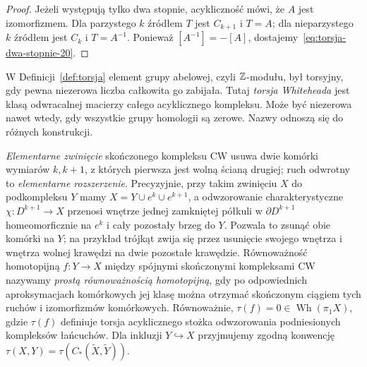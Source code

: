 \begin{proof}
Jeżeli występują tylko dwa stopnie, acykliczność
mówi, że $A$ jest izomorfizmem. Dla parzystego $k$
źródłem $T$ jest $C_{k+1}$ i $T=A$; dla nieparzystego
$k$ źródłem jest $C_k$ i $T=A^{-1}$.
Ponieważ $[A^{-1}]=-[A]$, dostajemy~\eqref{eq:torsja-dwa-stopnie-20}.
\end{proof}

\begin{uwaga}
W Definicji~\ref{def:torsja} element grupy abelowej,
czyli $\mathbb{Z}$-modułu, był torsyjny, gdy pewna niezerowa liczba
całkowita go zabijała. Tutaj \emph{torsja Whiteheada} jest klasą
odwracalnej macierzy całego acyklicznego kompleksu.
Może być niezerowa nawet wtedy, gdy wszystkie grupy
homologii są zerowe. Nazwy odnoszą się do różnych
konstrukcji.
\end{uwaga}

\begin{definicja}
\label{def:prosta-homotopia-20}
\emph{Elementarne zwinięcie} skończonego kompleksu CW
usuwa dwie komórki wymiarów $k,k+1$, z których
pierwsza jest wolną ścianą drugiej; ruch odwrotny
to \emph{elementarne rozszerzenie}.
Precyzyjnie, przy takim zwinięciu $X$ do podkompleksu $Y$ mamy
$X=Y\cup e^k\cup e^{k+1}$, a odwzorowanie charakterystyczne
$\chi:D^{k+1}\to X$ przenosi wnętrze jednej zamkniętej
półkuli w $\partial D^{k+1}$ homeomorficznie na $e^k$
i cały pozostały brzeg do $Y$. Pozwala to zsunąć obie komórki
na $Y$; na przykład trójkąt zwija się przez usunięcie swojego
wnętrza i wnętrza wolnej krawędzi na dwie pozostałe krawędzie.
Równoważność
homotopijną $f:Y\to X$ między spójnymi skończonymi kompleksami CW
nazywamy \emph{prostą równoważnością homotopijną}, gdy
po odpowiednich aproksymacjach komórkowych jej
klasę można otrzymać skończonym ciągiem tych
ruchów i izomorfizmów komórkowych. Równoważnie,
$\tau(f)=0\in\operatorname{Wh}(\pi_1X)$, gdzie
$\tau(f)$ definiuje torsja acyklicznego stożka
odwzorowania podniesionych kompleksów łańcuchów.
Dla inkluzji $Y\hookrightarrow X$ przyjmujemy
zgodną konwencję $\tau(X,Y)=\tau(C_*(\widetilde X,
\widetilde Y))$.
\end{definicja}

